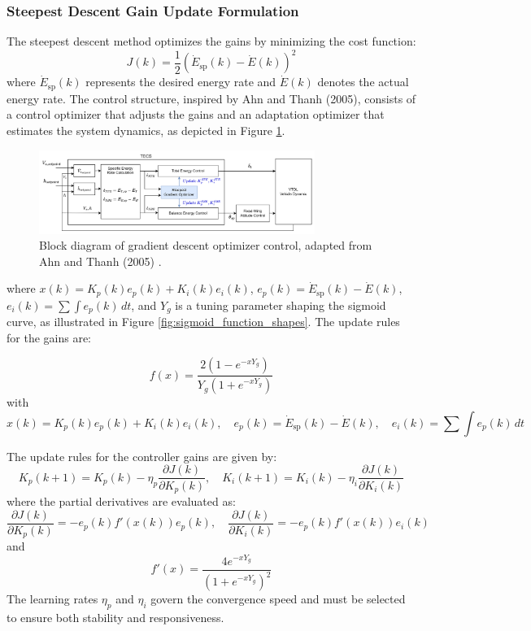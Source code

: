 \documentclass[journal,article,submit,pdftex,moreauthors]{Definitions/mdpi}
\begin{document}
\subsubsection{Steepest Descent Gain Update Formulation}
The steepest descent method optimizes the gains by minimizing the cost function:
\begin{equation}
    J(k) = \frac{1}{2}(\dot{E}_{\text{sp}}(k) - \dot{E}(k))^2
\end{equation}
where \(\dot{E}_{\text{sp}}(k)\) represents the desired energy rate and \(\dot{E}(k)\) denotes the actual energy rate. The control structure, inspired by Ahn and Thanh (2005), consists of a control optimizer that adjusts the gains and an adaptation optimizer that estimates the system dynamics, as depicted in Figure \ref{fig:gradient_descent_control_diagram}.

\begin{figure}[H]
    \centering
    \includegraphics[width=0.8\textwidth]{figures/gradient_descent_control_diagram.png}
    \caption{Block diagram of gradient descent optimizer control, adapted from Ahn and Thanh (2005) \cite{Ahn2005}.}
    \label{fig:gradient_descent_control_diagram}
\end{figure}

where \(x(k) = K_p(k)e_p(k) + K_i(k)e_i(k)\), \(e_p(k) = \dot{E}_{\text{sp}}(k) - \dot{E}(k)\), \(e_i(k) = \sum \int e_p(k) \, dt\), and \(Y_g\) is a tuning parameter shaping the sigmoid curve, as illustrated in Figure \ref{fig:sigmoid_function_shapes}. The update rules for the gains are:

\begin{equation}
    f(x) = \frac{2(1 - e^{-x Y_g})}{Y_g (1 + e^{-x Y_g})}
\end{equation}
with
\begin{equation}
    x(k) = K_p(k) e_p(k) + K_i(k) e_i(k), \quad e_p(k) = \dot{E}_{\text{sp}}(k) - \dot{E}(k), \quad e_i(k) = \sum \int e_p(k) \, dt
\end{equation}

The update rules for the controller gains are given by:
\begin{equation}
    K_p(k+1) = K_p(k) - \eta_p \frac{\partial J(k)}{\partial K_p(k)}, \quad K_i(k+1) = K_i(k) - \eta_i \frac{\partial J(k)}{\partial K_i(k)}
\end{equation}
where the partial derivatives are evaluated as:
\begin{equation}
    \frac{\partial J(k)}{\partial K_p(k)} = -e_p(k) f'(x(k)) e_p(k), \quad \frac{\partial J(k)}{\partial K_i(k)} = -e_p(k) f'(x(k)) e_i(k)
\end{equation}
and
\begin{equation}
    f'(x) = \frac{4e^{-x Y_g}}{(1 + e^{-x Y_g})^2}
\end{equation}
The learning rates $\eta_p$ and $\eta_i$ govern the convergence speed and must be selected to ensure both stability and responsiveness.
\end{document}
